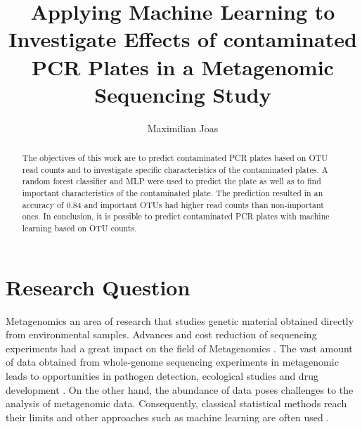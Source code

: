 \documentclass{svproc}
\begin{document}
\mainmatter              %
%
\title{Applying Machine Learning to Investigate Effects of contaminated PCR Plates in a Metagenomic Sequencing Study}
%
%
\author{Maximilian Joas }
%
%
%
%
\maketitle              %
%
\begin{abstract}
  The objectives of this work are to predict contaminated PCR plates based on OTU read counts and to investigate specific characteristics of the contaminated plates. A random forest classifier and MLP were used to predict the plate as well as to find important characteristics of the contaminated plate. The prediction resulted in an accuracy of 0.84 and important OTUs had higher read counts than non-important ones. In conclusion, it is possible to predict contaminated PCR plates with machine learning based on OTU counts.
\end{abstract}
%
%
\section{Research Question}
%
Metagenomics an area of research that studies genetic material obtained directly from environmental samples.
Advances and cost reduction of sequencing experiments had a great impact on the field of Metagenomics \cite{junemann2017bioinformatics}.
The vast amount of data obtained from whole-genome sequencing experiments in metagenomic leads to opportunities in pathogen detection, ecological studies and drug development \cite{chiu2019clinical}\cite{junemann2017bioinformatics}. On the other hand, the abundance of data poses challenges to the analysis of metagenomic data. Consequently, classical statistical methods reach their limits and other approaches such as machine learning are often used \cite{Soueidan2017}.\\
\end{document}
